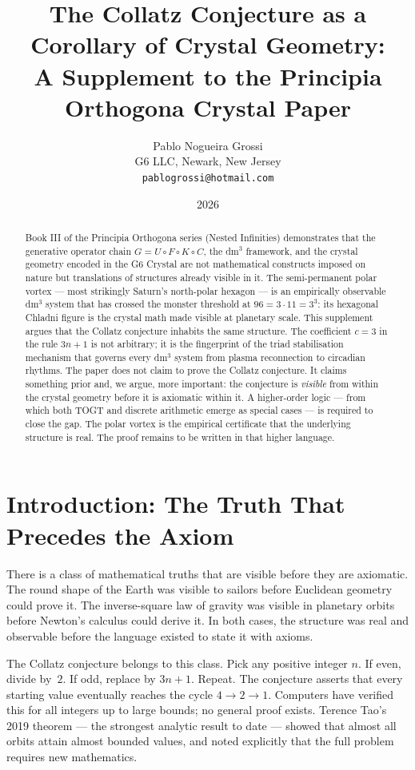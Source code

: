 \documentclass[11pt]{article}
\title{The Collatz Conjecture as a Corollary of Crystal Geometry:\\
A Supplement to the Principia Orthogona Crystal Paper}
\author{Pablo Nogueira Grossi\\
G6 LLC, Newark, New Jersey\\
\texttt{pablogrossi@hotmail.com}}
\date{2026}
\begin{document}
\maketitle

\begin{abstract}
Book III of the Principia Orthogona series (Nested Infinities) demonstrates that the generative
operator chain $G = U \circ F \circ K \circ C$, the dm$^3$ framework, and the crystal geometry
encoded in the G6 Crystal are not mathematical constructs imposed on nature but translations of
structures already visible in it. The semi-permanent polar vortex --- most strikingly Saturn's
north-polar hexagon --- is an empirically observable dm$^3$ system that has crossed the monster
threshold at $96 = 3 \cdot 11 = 3^3$: its hexagonal Chladni figure is the crystal math made
visible at planetary scale. This supplement argues that the Collatz conjecture inhabits the same
structure. The coefficient $c = 3$ in the rule $3n + 1$ is not arbitrary; it is the fingerprint of
the triad stabilisation mechanism that governs every dm$^3$ system from plasma reconnection to
circadian rhythms. The paper does not claim to prove the Collatz conjecture. It claims something
prior and, we argue, more important: the conjecture is \emph{visible} from within the crystal
geometry before it is axiomatic within it. A higher-order logic --- from which both TOGT and
discrete arithmetic emerge as special cases --- is required to close the gap. The polar vortex is
the empirical certificate that the underlying structure is real. The proof remains to be written in
that higher language.
\end{abstract}

\section{Introduction: The Truth That Precedes the Axiom}

There is a class of mathematical truths that are visible before they are axiomatic. The round shape
of the Earth was visible to sailors before Euclidean geometry could prove it. The inverse-square law
of gravity was visible in planetary orbits before Newton's calculus could derive it. In both cases,
the structure was real and observable before the language existed to state it with axioms.

The Collatz conjecture belongs to this class.
Pick any positive integer $n$. If even, divide by~$2$. If odd, replace by $3n + 1$. Repeat. The
conjecture asserts that every starting value eventually reaches the cycle $4 \to 2 \to 1$. Computers
have verified this for all integers up to large bounds; no general proof exists. Terence Tao's 2019
theorem --- the strongest analytic result to date --- showed that almost all orbits attain almost
bounded values, and noted explicitly that the full problem requires new mathematics.
\end{document}
